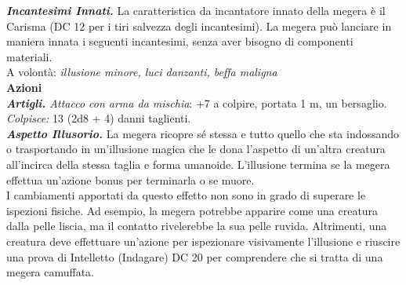 \begin{multicols}{2}
\emph{\textbf{Incantesimi Innati.}} La caratteristica da incantatore innato della megera è il Carisma (DC 12 per i tiri salvezza degli incantesimi). La megera può lanciare in maniera innata i seguenti incantesimi, senza aver bisogno di componenti materiali.\\

A volontà: \emph{illusione minore, luci danzanti, beffa maligna}\\

\smallskip\textbf{Azioni}\\

\emph{\textbf{Artigli.} Attacco con arma da mischia}: +7 a colpire, portata 1 m, un bersaglio.\\

\emph{Colpisce:} 13 (2d8 + 4) danni taglienti.\\

\emph{\textbf{Aspetto Illusorio.}} La megera ricopre sé stessa e tutto quello che sta indossando o trasportando in un'illusione magica che le dona l'aspetto di un'altra creatura all'incirca della stessa taglia e forma umanoide. L'illusione termina se la megera effettua un'azione bonus per terminarla o se muore.\\

I cambiamenti apportati da questo effetto non sono in grado di superare le ispezioni fisiche. Ad esempio, la megera potrebbe apparire come una creatura dalla pelle liscia, ma il contatto rivelerebbe la sua pelle ruvida. Altrimenti, una creatura deve effettuare un'azione per ispezionare visivamente l'illusione e riuscire una prova di Intelletto (Indagare) DC 20 per comprendere che si tratta di una megera camuffata.\\


\end{multicols}
